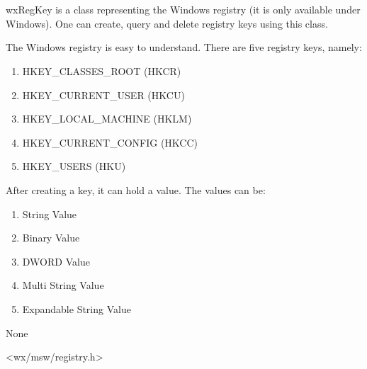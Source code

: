 
\section{}\label{wxregkey}

wxRegKey is a class representing the Windows registry (it is only available
under Windows). One can create, query and delete registry keys using this
class.

The Windows registry is easy to understand. There are five registry keys,
namely:

\begin{enumerate}\itemsep=0pt
\item HKEY\_CLASSES\_ROOT (HKCR)
\item HKEY\_CURRENT\_USER (HKCU)
\item HKEY\_LOCAL\_MACHINE (HKLM)
\item HKEY\_CURRENT\_CONFIG (HKCC)
\item HKEY\_USERS (HKU)
\end{enumerate}

After creating a key, it can hold a value. The values can be:

\begin{enumerate}\itemsep=0pt
\item String Value
\item Binary Value
\item DWORD Value
\item Multi String Value
\item Expandable String Value
\end{enumerate}


None


<wx/msw/registry.h>


